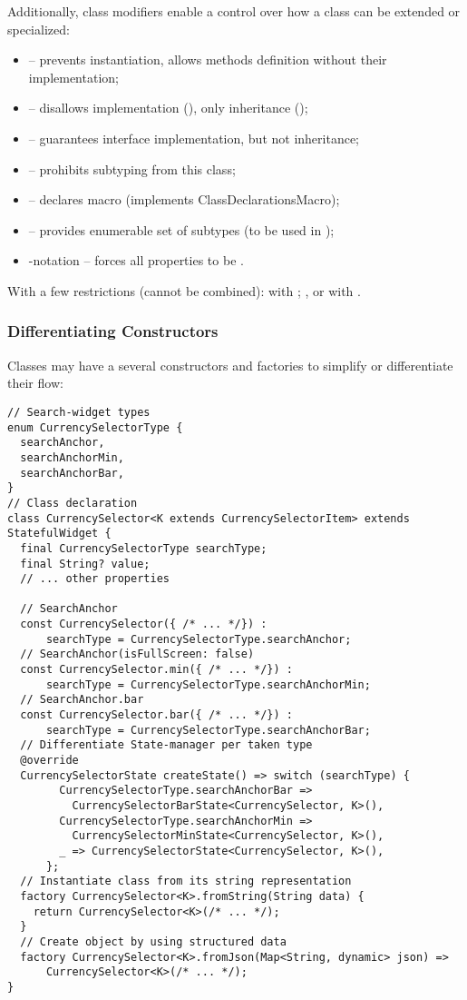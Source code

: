 \noindent Additionally, class modifiers enable a control over how a class can be extended or specialized:

\begin{itemize}
  \item {} -- prevents instantiation, allows methods definition without their implementation;
  \item {} -- disallows implementation (), only inheritance ();
  \item {} -- guarantees interface implementation, but not inheritance;
  \item {} -- prohibits subtyping from this class;
  \item {} -- declares macro (implements ClassDeclarationsMacro);
  \item {} -- provides enumerable set of subtypes (to be used in );
  \item {}-notation -- forces all properties to be .
\end{itemize}

\noindent With a few restrictions (cannot be combined):  with ; ,  or
 with .


\subsubsection{Differentiating Constructors}

Classes may have a several constructors and factories to simplify or differentiate their flow:

\begin{lstlisting}
// Search-widget types
enum CurrencySelectorType {
  searchAnchor,
  searchAnchorMin,
  searchAnchorBar,
}
// Class declaration
class CurrencySelector<K extends CurrencySelectorItem> extends StatefulWidget {
  final CurrencySelectorType searchType;
  final String? value;
  // ... other properties

  // SearchAnchor
  const CurrencySelector({ /* ... */}) :
      searchType = CurrencySelectorType.searchAnchor;
  // SearchAnchor(isFullScreen: false)
  const CurrencySelector.min({ /* ... */}) :
      searchType = CurrencySelectorType.searchAnchorMin;
  // SearchAnchor.bar
  const CurrencySelector.bar({ /* ... */}) :
      searchType = CurrencySelectorType.searchAnchorBar;
  // Differentiate State-manager per taken type
  @override
  CurrencySelectorState createState() => switch (searchType) {
        CurrencySelectorType.searchAnchorBar =>
          CurrencySelectorBarState<CurrencySelector, K>(),
        CurrencySelectorType.searchAnchorMin =>
          CurrencySelectorMinState<CurrencySelector, K>(),
        _ => CurrencySelectorState<CurrencySelector, K>(),
      };
  // Instantiate class from its string representation
  factory CurrencySelector<K>.fromString(String data) {
    return CurrencySelector<K>(/* ... */);
  }
  // Create object by using structured data
  factory CurrencySelector<K>.fromJson(Map<String, dynamic> json) =>
      CurrencySelector<K>(/* ... */);
}
\end{lstlisting}



